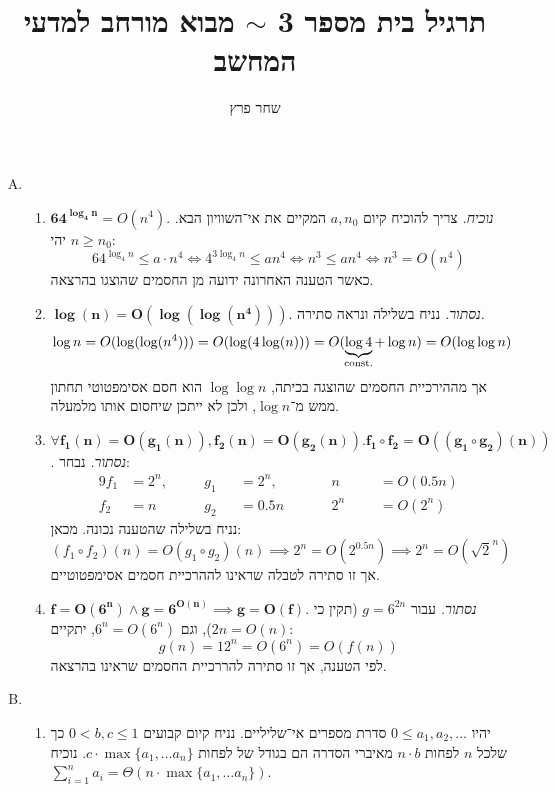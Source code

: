 \documentclass[]{article}
\author{שחר פרץ}
\title{תרגיל בית מספר 3 $\sim$ מבוא מורחב למדעי המחשב}
\newcommand\logn  {\log n}
\begin{document}
	\maketitle
	\section{}
	\begin{enumerate}[A)]
		\item 
		\begin{enumerate}[1.]
			\item $\bm{64^{\log_4n}} = O(n^4)$. \textit{נוכיח. }צריך להוכיח קיום $a, n_0$ המקיים את אי־השוויון הבא. יהי $n \ge n_0$: 
			\[ 64^{\log_4n} \le a \cdot n^4 \iff 4^{3 \log_4n} \le an^4 \iff n^3 \le an^4 \iff n^3 = O(n^4) \]
			כאשר הטענה האחרונה ידועה מן החסמים שהוצגו בהרצאה. 
			\item $\bm{\log(n) = O(\log(\log(n^4)))}$. \textit{נסתור. }נניח בשלילה ונראה סתירה. 
			\[ \logn = O(\log(\log(n^4))) = O(\log(4\log(n))) = O(\underbrace{\log 4 }_{\mathclap{\mathrm{const.}}} + \logn) = O(\log\logn) \]
			אך מההירכיית החסמים שהוצגה בכיתה, $\log\log n$ הוא חסם אסימפטוטי תחתון ממש מ־$\logn$, ולכן לא ייתכן שיחסום אותו מלמעלה. 
			\item $\bm{\forall f_1(n) = O(g_1(n)), f_2(n) = O(g_2(n)). f_1 \circ f_2 = O((g_1 \circ g_2)(n))}$. \textit{נסתור. }נבחר: 
			\begin{alignat*}{9}
				f_1 &= 2^n, &&\quad g_1 &&= 2^n, &&&\quad n &&&= O(0.5n) \\
				f_2 &= n &&\quad g_2 &&= 0.5n &&&\quad 2^n &&&= O(2^n)
			\end{alignat*}
			נניח בשלילה שהטענה נכונה. מכאן: 
			\[ (f_1 \circ f_2)(n) = O(g_1 \circ g_2)(n) \implies 2^n = O(2^{0.5n}) \implies 2^n = O(\sqrt2^n) \]
			אך זו סתירה לטבלה שראינו לההרכיית חסמים אסימפטוטיים. 
			\item $\bm{f = O(6^n) \land g = 6^{O(n)} \implies g = O(f)}$. \textit{נסתור. }עבור $g = 6^{2n}$ (תקין כי $2n = O(n)$), וגם $6^n = O(6^n)$, יתקיים: 
			\[ g(n) = 12^n = O(6^n) = O(f(n)) \]
			לפי הטענה, אך זו סתירה להררכיית החסמים שראינו בהרצאה. 
		\end{enumerate}
		\item \begin{enumerate}[1.]
			\item יהיו $0 \le a_1, a_2, \dots $ סדרת מספרים אי־שליליים. נניח קיום קבועים $0 < b, c \le 1$ כך שלכל $n$ לפחות $n \cdot b$ מאיברי הסדרה הם בגודל של לפחות $c \cdot \max\{a_1, \dots a_n\}$. נוכיח $\sum_{i = 1}^{n}a_i = \Theta(n \cdot \max\{a_1, \dots a_n\})$. 
			

\end{enumerate}
\end{enumerate}
\end{document}
